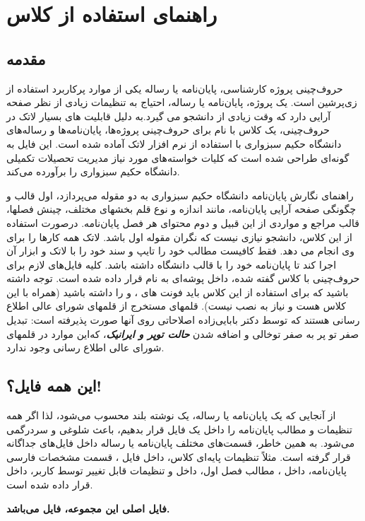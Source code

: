 
\chapter{راهنمای استفاده از کلاس}

\section{مقدمه}
حروف‌چینی پروژه کارشناسی، پایان‌نامه یا رساله یکی از موارد پرکاربرد استفاده از زی‌پرشین\cite{Khalighi2015xepersian} است.  یک پروژه، پایان‌نامه یا رساله،  احتیاج به تنظیمات زیادی از نظر صفحه آرایی  دارد که وقت زیادی از دانشجو می گیرد.به دلیل قابلیت های بسیار لاتک در حروف‌چینی، یک کلاس با نام 
 برای حروف‌چینی پروژه‌ها، پایان‌نامه‌ها و رساله‌های دانشگاه حکیم سبزواری با استفاده از نرم افزار لاتک  آماده شده است. این فایل به 
گونه‌ای طراحی شده است که کلیات خواسته‌های مورد نیاز  مدیریت تحصیلات تکمیلی دانشگاه حکیم سبزواری
 را برآورده می‌کند.%

راهنمای نگارش پایان‌نامه دانشگاه حکیم سبزواری به دو مقوله می‌پردازد، اول قالب و چگونگی صفحه آرایی پایان‌نامه، مانند اندازه و نوع قلم بخشهای مختلف، چینش فصلها، قالب مراجع و مواردی از این قبیل و دوم محتوای هر فصل پایان‌نامه. 
درصورت استفاده از این کلاس، دانشجو  نیازی نیست که نگران مقوله اول باشد. لاتک همه کارها را برای وی انجام می دهد. فقط کافیست مطالب خود را تایپ و سند خود را با لاتک و ابزار آن اجرا کند تا پایان‌نامه خود را با قالب دانشگاه داشته باشد.
کلیه فایل‌های لازم برای حروف‌چینی با کلاس گفته شده، داخل پوشه‌ای به نام
  قرار داده شده است. توجه داشته باشید که برای استفاده از این کلاس باید فونت های
  ،
و
را داشته باشید (همراه با این کلاس هست و نیاز به نصب نیست).
 قلمهای 
  مستخرج از قلمهای
شورای عالی اطلاع رسانی هستند که توسط دکتر بابایی‌زاده اصلاحاتی روی آنها صورت پذیرفته است: تبدیل صفر تو پر به صفر توخالی و اضافه شدن
\textit{\textbf{حالت توپر و ایرانیک}}،
که‌این موارد در قلمهای شورای عالی اطلاع رسانی وجود ندارد.

\section{این همه فایل؟!}\label{sec2}
از آنجایی که یک پایان‌نامه یا رساله، یک نوشته بلند محسوب می‌شود، لذا اگر همه تنظیمات و مطالب پایان‌نامه را داخل یک فایل قرار بدهیم، باعث شلوغی
و سردرگمی می‌شود. به همین خاطر، قسمت‌های مختلف پایان‌نامه یا رساله  داخل فایل‌های جداگانه قرار گرفته است. مثلاً تنظیمات پایه‌ای کلاس، داخل فایل
، 
قسمت مشخصات فارسی پایان‌نامه، داخل 
،
مطالب فصل اول، داخل 
و تنظیمات قابل تغییر توسط کاربر، داخل 
 قرار داده شده است. 
\begin{center}
\textbf{ فایل اصلی این مجموعه، فایل
می‌باشد. }
\end{center}

